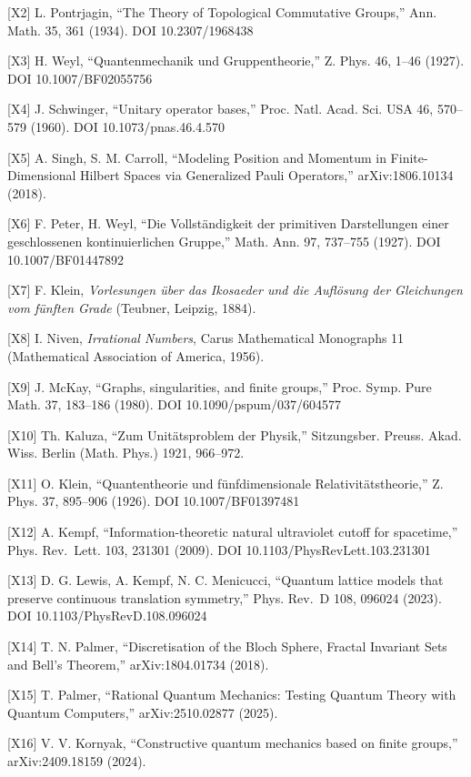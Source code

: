 \documentclass[
  a4paper,
]{article}
\begin{document}
{[}X2{]} L. Pontrjagin, ``The Theory of Topological Commutative
Groups,'' Ann. Math. 35, 361 (1934). DOI 10.2307/1968438

{[}X3{]} H. Weyl, ``Quantenmechanik und Gruppentheorie,'' Z. Phys. 46,
1--46 (1927). DOI 10.1007/BF02055756

{[}X4{]} J. Schwinger, ``Unitary operator bases,'' Proc. Natl. Acad.
Sci. USA 46, 570--579 (1960). DOI 10.1073/pnas.46.4.570

{[}X5{]} A. Singh, S. M. Carroll, ``Modeling Position and Momentum in
Finite-Dimensional Hilbert Spaces via Generalized Pauli Operators,''
arXiv:1806.10134 (2018).

{[}X6{]} F. Peter, H. Weyl, ``Die Vollständigkeit der primitiven
Darstellungen einer geschlossenen kontinuierlichen Gruppe,'' Math. Ann.
97, 737--755 (1927). DOI 10.1007/BF01447892

{[}X7{]} F. Klein, \emph{Vorlesungen über das Ikosaeder und die
Auflösung der Gleichungen vom fünften Grade} (Teubner, Leipzig, 1884).

{[}X8{]} I. Niven, \emph{Irrational Numbers}, Carus Mathematical
Monographs 11 (Mathematical Association of America, 1956).

{[}X9{]} J. McKay, ``Graphs, singularities, and finite groups,'' Proc.
Symp. Pure Math. 37, 183--186 (1980). DOI 10.1090/pspum/037/604577

{[}X10{]} Th. Kaluza, ``Zum Unitätsproblem der Physik,'' Sitzungsber.
Preuss. Akad. Wiss. Berlin (Math. Phys.) 1921, 966--972.

{[}X11{]} O. Klein, ``Quantentheorie und fünfdimensionale
Relativitätstheorie,'' Z. Phys. 37, 895--906 (1926). DOI
10.1007/BF01397481

{[}X12{]} A. Kempf, ``Information-theoretic natural ultraviolet cutoff
for spacetime,'' Phys. Rev.~Lett. 103, 231301 (2009). DOI
10.1103/PhysRevLett.103.231301

{[}X13{]} D. G. Lewis, A. Kempf, N. C. Menicucci, ``Quantum lattice
models that preserve continuous translation symmetry,'' Phys. Rev.~D
108, 096024 (2023). DOI 10.1103/PhysRevD.108.096024

{[}X14{]} T. N. Palmer, ``Discretisation of the Bloch Sphere, Fractal
Invariant Sets and Bell's Theorem,'' arXiv:1804.01734 (2018).

{[}X15{]} T. Palmer, ``Rational Quantum Mechanics: Testing Quantum
Theory with Quantum Computers,'' arXiv:2510.02877 (2025).

{[}X16{]} V. V. Kornyak, ``Constructive quantum mechanics based on
finite groups,'' arXiv:2409.18159 (2024).
\end{document}

